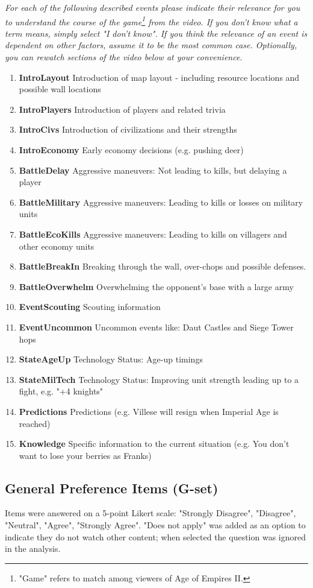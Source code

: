\textit{For each of the following described events please indicate their relevance for you to understand the course of the game\footnote{"Game" refers to match among viewers of Age of Empires II.} from the video. If you don't know what a term means, simply select "I don't know". If you think the relevance of an event is dependent on other factors, assume it to be the most common case. Optionally, you can rewatch sections of the video below at your convenience.}
\begin{enumerate}[label={C\arabic*}]
  \item \textbf{IntroLayout} Introduction of map layout - including resource locations and possible wall locations
  \item \textbf{IntroPlayers} Introduction of players and related trivia
  \item \textbf{IntroCivs} Introduction of civilizations and their strengths
  \item \textbf{IntroEconomy} Early economy decisions (e.g. pushing deer)
  \item \textbf{BattleDelay} Aggressive maneuvers: Not leading to kills, but delaying a player
  \item \textbf{BattleMilitary} Aggressive maneuvers: Leading to kills or losses on military units
  \item \textbf{BattleEcoKills} Aggressive maneuvers: Leading to kills on villagers and other economy units
  \item \textbf{BattleBreakIn} Breaking through the wall, over-chops and possible defenses.
  \item \textbf{BattleOverwhelm} Overwhelming the opponent's base with a large army
  \item \textbf{EventScouting} Scouting information
  \item \textbf{EventUncommon} Uncommon events like: Daut Castles and Siege Tower hops
  \item \textbf{StateAgeUp} Technology Status: Age-up timings
  \item \textbf{StateMilTech} Technology Status: Improving unit strength leading up to a fight, e.g. "+4 knights"
  \item \textbf{Predictions} Predictions (e.g. Villese will resign when Imperial Age is reached)
  \item \textbf{Knowledge} Specific information to the current situation (e.g. You don't want to lose your berries as Franks)
\end{enumerate}

\subsection{General Preference Items (G-set)}
Items were answered on a 5-point Likert scale: "Strongly Disagree", "Disagree", "Neutral", "Agree", "Strongly Agree". "Does not apply" was added as an option to indicate they do not watch other content; when selected the question was ignored in the analysis.

